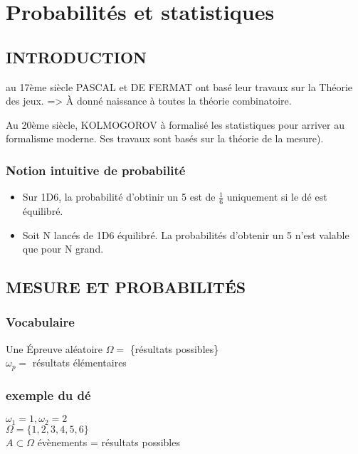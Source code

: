 \documentclass[]{article}
\author{}
\date{}
\begin{document}
\newcommand \differential[2] {
    \frac{\mathrm{d} #1}{\mathrm{d}#2}
}
\newcommand \dd[1] {
    \mathrm{#1}
}

\section{Probabilités et statistiques}

\subsection{INTRODUCTION}

au 17ème siècle PASCAL et DE FERMAT ont basé leur travaux sur la Théorie
des jeux. =\textgreater{} À donné naissance à toutes la théorie
combinatoire.

Au 20ème siècle, KOLMOGOROV à formalisé les statistiques pour arriver au
formalisme moderne. Ses travaux sont basés sur la théorie de la mesure).

\subsubsection{Notion intuitive de probabilité}

\begin{itemize}
\item
  Sur 1D6, la probabilité d'obtinir un 5 est de $\frac{1}{6}$ uniquement
  si le dé est équilibré.
\item
  Soit N lancés de 1D6 équilibré. La probabilités d'obtenir un 5 n'est
  valable que pour N grand.
\end{itemize}

\subsection{MESURE ET PROBABILITÉS}

\subsubsection{Vocabulaire}

Une Épreuve aléatoire $\Omega =$ \{résultats possibles\}\\$\omega_p =$
résultats élémentaires

\subsubsection{exemple du dé}

$\omega_1 = 1, \omega_2 =2$\\$\Omega = \{ 1, 2, 3, 4, 5, 6 \}$\\$A \subset \Omega$
évènements = résultats possibles
\end{document}
